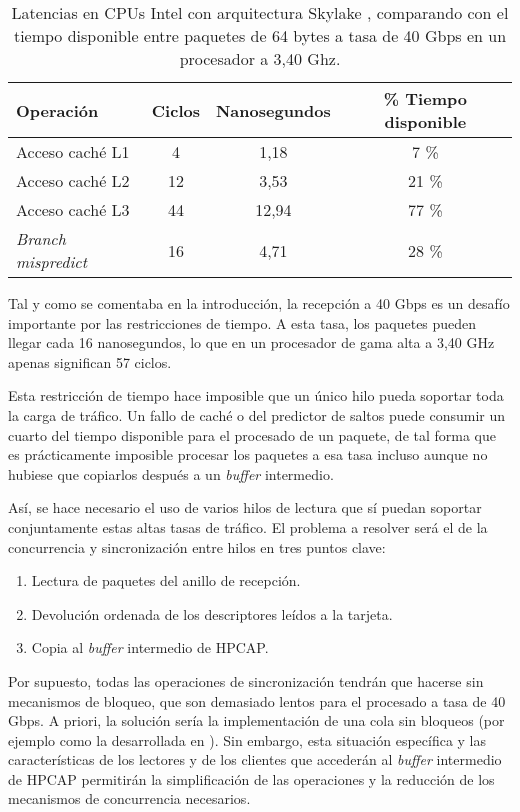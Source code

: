 \documentclass[twoside, 12pt, draft]{epstfg}
\begin{document}
\begin{table}[hbtp]
\centering
\begin{tabular}{lccc}
\toprule
\textbf{Operación} & \textbf{Ciclos} & \textbf{Nanosegundos} & \textbf{\% Tiempo disponible} \\ \midrule
Acceso caché L1 & 4 	& 	1,18 & 	7 \% \\
Acceso caché L2 & 12 	& 	3,53 & 	21 \% \\
Acceso caché L3 & 44 	&  12,94 & 77 \% \\
\textit{Branch mispredict} & 16 & 4,71 & 28 \% \\ \bottomrule
\end{tabular}
\caption[Latencias en CPUs Intel con arquitectura Skylake]{Latencias en CPUs Intel con arquitectura Skylake \cite{intelOptimization}, comparando con el tiempo disponible entre paquetes de 64 bytes a tasa de 40 Gbps en un procesador a 3,40 Ghz.}
\label{tab:Desarrollo:LatenciaIntelSkylake}
\end{table}

Tal y como se comentaba en la introducción, la recepción a 40 Gbps es un desafío importante por las restricciones de tiempo. A esta tasa, los paquetes pueden llegar cada 16 nanosegundos, lo que en un procesador de gama alta a 3,40 GHz apenas significan 57 ciclos.

Esta restricción de tiempo hace imposible que un único hilo pueda soportar toda la carga de tráfico. Un fallo de caché o del predictor de saltos puede consumir un cuarto del tiempo disponible para el procesado de un paquete, de tal forma que es prácticamente imposible procesar los paquetes a esa tasa incluso aunque no hubiese que copiarlos después a un \textit{buffer} intermedio.

Así, se hace necesario el uso de varios hilos de lectura que sí puedan soportar conjuntamente estas altas tasas de tráfico. El problema a resolver será el de la concurrencia y sincronización entre hilos en tres puntos clave:

\begin{enumerate}[itemsep=0pt, topsep = 0pt]
\item Lectura de paquetes del anillo de recepción.
\item Devolución ordenada de los descriptores leídos a la tarjeta.
\item Copia al \textit{buffer} intermedio de HPCAP.
\end{enumerate}

Por supuesto, todas las operaciones de sincronización tendrán que hacerse sin mecanismos de bloqueo, que son demasiado lentos para el procesado a tasa de 40 Gbps. A priori, la solución sería la implementación de una cola sin bloqueos (por ejemplo como la desarrollada en \cite{krizhanovsky2013lock}). Sin embargo, esta situación específica y las características de los lectores y de los clientes que accederán al \textit{buffer} intermedio de HPCAP permitirán la simplificación de las operaciones y la reducción de los mecanismos de concurrencia necesarios.
\end{document}
